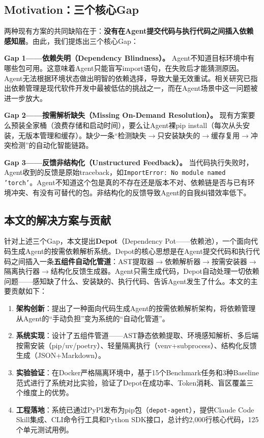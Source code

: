 \documentclass[10pt]{ctexart}
\begin{document}
\subsection{Motivation：三个核心Gap}
两种现有方案的共同缺陷在于：\textbf{没有在Agent提交代码与执行代码之间插入依赖感知层}。由此，我们提炼出三个核心Gap：

\textbf{Gap 1——依赖失明（Dependency Blindness）。} Agent不知道目标环境中有哪些包可用。这意味着Agent只能盲写import语句，在失败后才能猜测原因。Agent无法根据环境状态做出明智的依赖选择，导致大量无效重试。相关研究\cite{cox2019dependency}已指出依赖管理是现代软件开发中最被低估的挑战之一，而在Agent场景中这一问题被进一步放大。

\textbf{Gap 2——按需解析缺失（Missing On-Demand Resolution）。} 现有方案要么预装全家桶（浪费存储和启动时间），要么让Agent裸pip install（每次从头安装，无版本管理和缓存）。缺少一条“检测缺失$\rightarrow$只安装缺失的$\rightarrow$缓存复用$\rightarrow$冲突检测”的自动化智能链路。

\textbf{Gap 3——反馈非结构化（Unstructured Feedback）。} 当代码执行失败时，Agent收到的反馈是原始traceback，如\texttt{ImportError: No module named 'torch'}。Agent不知道这个包是真的不存在还是版本不对、依赖链是否与已有环境冲突、有没有可替代的包。非结构化的反馈导致Agent的自我纠错效率低下\cite{openai2024pricing,anthropic2024pricing}。

\subsection{本文的解决方案与贡献}
针对上述三个Gap，本文提出\textbf{Depot}（Dependency Pot——依赖池），一个面向代码生成Agent的按需依赖解析系统。Depot的核心思想是在Agent提交代码和执行代码之间插入一条\textbf{五组件自动化管道}：AST提取器$\rightarrow$依赖解析器$\rightarrow$按需安装器$\rightarrow$隔离执行器$\rightarrow$结构化反馈生成器。Agent只需生成代码，Depot自动处理一切依赖问题——感知缺了什么、安装缺的、执行代码、告诉Agent发生了什么。本文的主要贡献如下：

\begin{enumerate}[leftmargin=1.5em,itemsep=0pt]
    \item \textbf{架构创新}：提出了一种面向代码生成Agent的按需依赖解析架构，将依赖管理从Agent的“手动负担”变为系统的“自动化管道”。
    \item \textbf{系统实现}：设计了五组件管道——AST静态依赖提取、环境感知解析、多后端按需安装（pip/uv/poetry）、轻量隔离执行（venv+subprocess）、结构化反馈生成（JSON+Markdown）。
    \item \textbf{实验验证}：在Docker严格隔离环境中，基于15个Benchmark任务和3种Baseline范式进行了系统对比实验，验证了Depot在成功率、Token消耗、盲区覆盖三个维度上的优势。
    \item \textbf{工程落地}：系统已通过PyPI发布为pip包（\texttt{depot-agent}），提供Claude Code Skill集成、CLI命令行工具和Python SDK接口，总计约2,000行核心代码，125个单元测试用例。
\end{enumerate}
\end{document}
